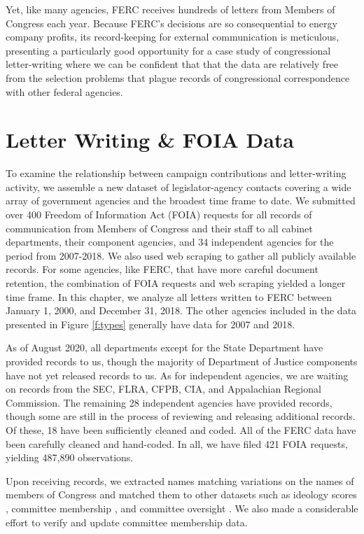 \documentclass{article}
\begin{document}
Yet, like many agencies, FERC receives hundreds of letters from Members of Congress each year. Because FERC's decisions are so consequential to energy company profits, its record-keeping for external communication is meticulous, presenting a particularly good opportunity for a case study of congressional letter-writing where we can be confident that that the data are relatively free from the selection problems that plague records of congressional correspondence with other federal agencies. 

\section{Letter Writing \& FOIA Data}

To examine the relationship between campaign contributions and letter-writing activity, we assemble a new dataset of legislator-agency contacts covering a wide array of government agencies and the broadest time frame to date. We submitted over 400 Freedom of Information Act (FOIA) requests for all records of communication from Members of Congress and their staff to all cabinet departments, their component agencies, and 34 independent agencies for the period from 2007-2018. We also used web scraping to gather all publicly available records. For some agencies, like FERC, that have more careful document retention, the combination of FOIA requests and web scraping yielded a longer time frame. In this chapter, we analyze all letters written to FERC between January 1, 2000, and December 31, 2018. The other agencies included in the data presented in Figure \ref{f:types} generally have data for 2007 and 2018. 

As of August 2020, all departments except for the State Department have provided records to us, though the majority of Department of Justice components have not yet released records to us.
As for independent agencies, we are waiting on records from the SEC, FLRA, CFPB, CIA, and Appalachian Regional Commission. 
The remaining 28 independent agencies have provided records, though some are still in the process of reviewing and releasing additional records. 
Of these, 18 have been sufficiently cleaned and coded. All of the FERC data have been carefully cleaned and hand-coded.  In all, we have filed 421 FOIA requests, yielding 487,890 observations.

Upon receiving records, we extracted names matching variations on the names of members of Congress and matched them to other datasets such as ideology scores \citep{dwnominate2018}, committee membership \citep{StewartWoon2017}, and committee oversight \citep{LewisSelin2012}. We also made a considerable effort to verify and update committee membership data. 
\end{document}
